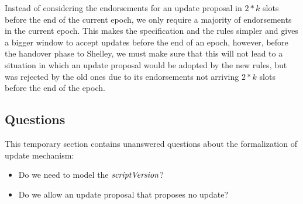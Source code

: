 Instead of considering the endorsements for an update proposal in $2*k$ slots
before the end of the current epoch, we only require a majority of endorsements
in the current epoch. This makes the specification and the rules simpler and
gives a bigger window to accept updates before the end of an epoch, however,
before the handover phase to Shelley, we must make sure that this will not lead
to a situation in which an update proposal would be adopted by the new rules,
but was rejected by the old ones due to its endorsements not arriving $2*k$
slots before the end of the epoch.

\subsection{Questions}
\label{sec:up-questions}

This temporary section contains unanswered questions about the formalization of
update mechanism:

\begin{itemize}
\item Do we need to model the $\mathit{scriptVersion}$?
\item Do we allow an update proposal that proposes no update?
\end{itemize}

